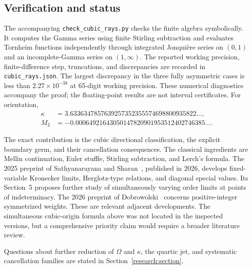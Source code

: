 \subsection{Verification and status}

The accompanying \texttt{check\_cubic\_rays.py} checks the finite algebra
symbolically.  It computes the Gamma series using finite Stirling
subtraction and evaluates Tornheim functions independently through
integrated Jonqui\`ere series on $(0,1)$ and an incomplete-Gamma series
on $(1,\infty)$.  The reported working precision, finite-difference
step, truncations, and discrepancies are recorded in
\texttt{cubic\_rays.json}.  The largest discrepancy in the three fully asymmetric cases is less than
$2.27\times10^{-38}$ at 65-digit working precision.  These numerical
diagnostics accompany the proof; the floating-point results are not interval certificates.
For orientation,
\begin{align*}
 \kappa&=3.6336347857639257352355574698800935822\ldots,\\
 M_2&=-0.00064921643050147820901953512402746385\ldots.
\end{align*}

The exact contribution is the cubic directional classification,
the explicit boundary germ, and their cancellation consequences.
The classical ingredients are Mellin continuation, Euler stuffle,
Stirling subtraction, and Lerch's formula.  The 2025 preprint of
Sathyanarayana and Sharan~\cite{tr3:SS}, published in 2026, develops fixed-variable
Kronecker limits, Herglotz-type relations, and diagonal special values.
Its Section~5 proposes further study of simultaneously varying order
limits at points of indeterminacy.  The 2026 preprint of
Dobrowolski~\cite{tr3:Dobrowolski} concerns positive-integer symmetrized weights.  These are
relevant adjacent developments.  The simultaneous cubic-origin formula
above was not located in the inspected versions, but a comprehensive
priority claim would require a broader literature review.

Questions about further reduction of $\Omega$ and $\kappa$, the quartic
jet, and systematic cancellation families are stated in
Section~\ref{research:section}.
